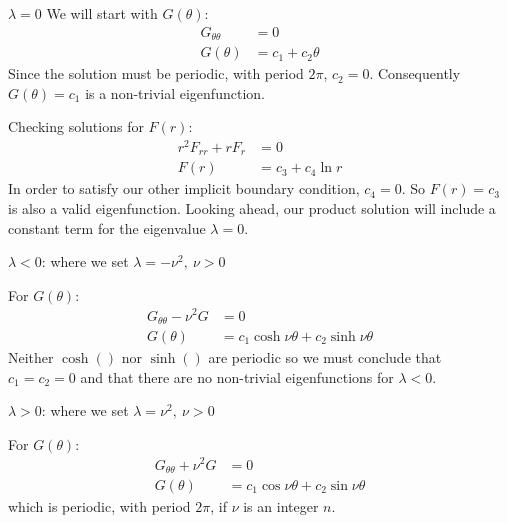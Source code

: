 \vspace{0.15cm}

\noindent\underline{$\lambda = 0$}
We will start with $G(\theta)$:
\begin{align*}
G_{\theta \theta} &= 0 \\
G(\theta) &= c_1 + c_2\theta
\end{align*}
Since the solution must be periodic, with period $2\pi$, $c_2 = 0$.  Consequently $G(\theta) = c_1$ is a non-trivial eigenfunction.

Checking solutions for $F(r)$:
\begin{align*}
r^2F_{rr} + rF_{r} &= 0 \\
F(r) &= c_3 + c_4 \ln{r}
\end{align*}
In order to satisfy our other implicit boundary condition, $c_4 = 0$.  So $F(r)=  c_3$ is also a valid eigenfunction.  Looking ahead, our product solution will include a constant term for the eigenvalue $\lambda = 0$.

\vspace{0.15cm}

\noindent\underline{$\lambda < 0$}: where we set $\lambda = -\nu^2, \ \nu>0$

For $G(\theta)$:
\begin{align*}
G_{\theta \theta} - \nu^2 G &= 0 \\
G(\theta) &= c_1 \cosh{\nu \theta} + c_2 \sinh{\nu \theta}
\end{align*}
Neither $\cosh{()}$ nor $\sinh{()}$ are periodic so we must conclude that $c_1 = c_2 = 0$ and that there are no non-trivial eigenfunctions for $\lambda < 0$.


\vspace{0.15cm}

\noindent\underline{$\lambda > 0$}: where we set $\lambda = \nu^2, \ \nu>0$

For $G(\theta)$:
\begin{align*}
G_{\theta \theta} + \nu^2 G &= 0 \\
G(\theta) &= c_1 \cos{\nu \theta} + c_2 \sin{\nu \theta}
\end{align*}
which is periodic, with period $2\pi$, if $\nu$ is an integer $n$.

